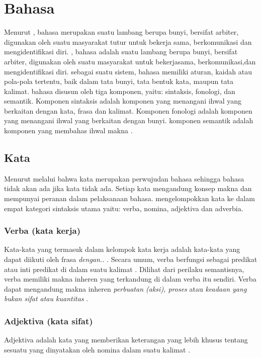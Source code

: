 \section{Bahasa} %
\label{sec:section_name}
Menurut \citet{chaer}, bahasa merupakan suatu lambang berupa bunyi, bersifat arbiter, digunakan oleh suatu masyarakat tutur untuk bekerja sama, berkomunikasi dan mengidentifikasi diri. \citet{dardjo}, bahasa adalah suatu lambang berupa bunyi, bersifat arbiter, digunakan oleh suatu masyarakat untuk bekerjasama, berkomunikasi,dan mengidentifikasi diri.
sebagai suatu sistem, bahasa memiliki aturan, kaidah atau pola-pola tertentu, baik dalam tata bunyi, tata bentuk kata, maupun tata kalimat. bahasa disusun oleh tiga komponen, yaitu: sintaksis, fonologi, dan semantik. Komponen sintaksis adalah komponen yang menangani ihwal yang berkaitan dengan kata, frasa dan kalimat. Komponen fonologi adalah komponen yang menangani ihwal yang berkaitan dengan bunyi. komponen semantik adalah komponen yang membahas ihwal makna \citep{dardjo}.

\subsection{Kata}
Menurut \citet{chaer} melalui \citet{admodjo} bahwa kata merupakan perwujudan bahasa sehingga bahasa tidak akan ada jika kata tidak ada. Setiap kata mengandung konsep makna dan mempunyai peranan dalam pelaksanaan bahasa. \citet{alwi} mengelompokkan kata ke dalam empat kategori sintaksis utama yaitu: verba, nomina, adjektiva dan adverbia.

\subsubsection{Verba (kata kerja)}
Kata-kata yang termasuk dalam kelompok kata kerja adalah kata-kata yang dapat diikuti oleh frasa \emph{dengan..} \citet{chaer}. Secara umum, verba berfungsi sebagai predikat atau inti predikat di dalam suatu kalimat \citep{alwi}. Dilihat dari perilaku semantisnya, verba memiliki makna inheren yang terkandung di dalam verba itu sendiri. Verba dapat mengandung makna inheren \emph{perbuatan (aksi), proses} atau \emph{keadaan yang bukan sifat atau kuantitas} \citep{alwi}.

\subsubsection{Adjektiva (kata sifat)}
Adjektiva adalah kata yang memberikan keterangan yang lebih khusus tentang sesuatu yang  dinyatakan oleh nomina dalam suatu kalimat \citep{alwi}. 

